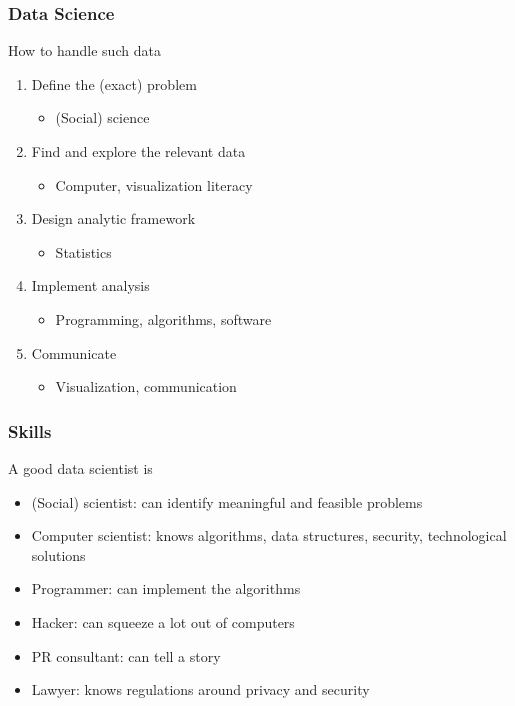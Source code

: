 \documentclass[mathserif, xcolor=table, svgnames]{beamer}
\begin{document}
\begin{frame}
\frametitle{Data Science}
How to handle such data
\begin{enumerate}
\item Define the (exact) problem
  \begin{itemize}
  \item (Social) science
  \end{itemize}
\item Find and explore the relevant data
  \begin{itemize}
  \item Computer, visualization literacy
  \end{itemize}
\item Design analytic framework
  \begin{itemize}
  \item Statistics
  \end{itemize}
\item Implement analysis
  \begin{itemize}
  \item Programming, algorithms, software
  \end{itemize}
\item Communicate
  \begin{itemize}
  \item Visualization, communication
  \end{itemize}
\end{enumerate}
\end{frame}


\begin{frame}
  \frametitle{Skills}
  A good data scientist is
  \begin{itemize}
  \item (Social) scientist: can identify meaningful and feasible
    problems 
  \item Computer scientist: knows algorithms, data structures,
    security, technological solutions
  \item Programmer: can implement the algorithms
  \item Hacker: can squeeze a lot out of computers
  \item PR consultant: can tell a story
  \item Lawyer: knows regulations around privacy and security
  \end{itemize}
\end{frame}
\end{document}
